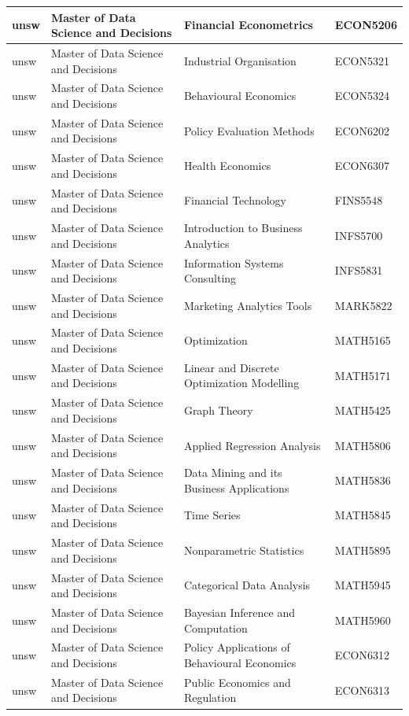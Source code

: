 \documentclass[
  letterpaper,
  DIV=11,
  numbers=noendperiod]{scrreport}
\begin{document}
\begin{table}
\begin{tabular}{l|l|l|l}
\hline
unsw & Master of Data Science and Decisions & Financial Econometrics & ECON5206\\
\hline
unsw & Master of Data Science and Decisions & Industrial Organisation & ECON5321\\
\hline
unsw & Master of Data Science and Decisions & Behavioural Economics & ECON5324\\
\hline
unsw & Master of Data Science and Decisions & Policy Evaluation Methods & ECON6202\\
\hline
unsw & Master of Data Science and Decisions & Health Economics & ECON6307\\
\hline
unsw & Master of Data Science and Decisions & Financial Technology & FINS5548\\
\hline
unsw & Master of Data Science and Decisions & Introduction to Business Analytics & INFS5700\\
\hline
unsw & Master of Data Science and Decisions & Information Systems Consulting & INFS5831\\
\hline
unsw & Master of Data Science and Decisions & Marketing Analytics Tools & MARK5822\\
\hline
unsw & Master of Data Science and Decisions & Optimization & MATH5165\\
\hline
unsw & Master of Data Science and Decisions & Linear and Discrete Optimization Modelling & MATH5171\\
\hline
unsw & Master of Data Science and Decisions & Graph Theory & MATH5425\\
\hline
unsw & Master of Data Science and Decisions & Applied Regression Analysis & MATH5806\\
\hline
unsw & Master of Data Science and Decisions & Data Mining and its Business Applications & MATH5836\\
\hline
unsw & Master of Data Science and Decisions & Time Series & MATH5845\\
\hline
unsw & Master of Data Science and Decisions & Nonparametric Statistics & MATH5895\\
\hline
unsw & Master of Data Science and Decisions & Categorical Data Analysis & MATH5945\\
\hline
unsw & Master of Data Science and Decisions & Bayesian Inference and Computation & MATH5960\\
\hline
unsw & Master of Data Science and Decisions & Policy Applications of Behavioural Economics & ECON6312\\
\hline
unsw & Master of Data Science and Decisions & Public Economics and Regulation & ECON6313\\

\end{tabular}
\end{table}
\end{document}
